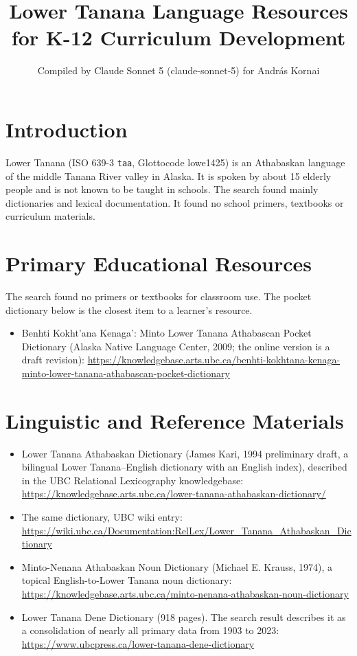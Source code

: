 \documentclass[12pt]{article}
\title{Lower Tanana Language Resources for K-12 Curriculum Development}
\author{Compiled by Claude Sonnet 5 (claude-sonnet-5) for Andr\'as Kornai}
\date{}
\begin{document}
\maketitle

\section{Introduction}
Lower Tanana (ISO 639-3 \texttt{taa}, Glottocode lowe1425) is an Athabaskan language of the middle Tanana River valley in Alaska. It is spoken by about 15 elderly people and is not known to be taught in schools. The search found mainly dictionaries and lexical documentation. It found no school primers, textbooks or curriculum materials.

\section{Primary Educational Resources}
The search found no primers or textbooks for classroom use. The pocket dictionary below is the closest item to a learner's resource.
\begin{itemize}
\item Benhti Kokht'ana Kenaga': Minto Lower Tanana Athabascan Pocket Dictionary (Alaska Native Language Center, 2009; the online version is a draft revision): \url{https://knowledgebase.arts.ubc.ca/benhti-kokhtana-kenaga-minto-lower-tanana-athabascan-pocket-dictionary}
\end{itemize}

\section{Linguistic and Reference Materials}
\begin{itemize}
\item Lower Tanana Athabaskan Dictionary (James Kari, 1994 preliminary draft, a bilingual Lower Tanana--English dictionary with an English index), described in the UBC Relational Lexicography knowledgebase: \url{https://knowledgebase.arts.ubc.ca/lower-tanana-athabaskan-dictionary/}
\item The same dictionary, UBC wiki entry: \url{https://wiki.ubc.ca/Documentation:RelLex/Lower_Tanana_Athabaskan_Dictionary}
\item Minto-Nenana Athabaskan Noun Dictionary (Michael E. Krauss, 1974), a topical English-to-Lower Tanana noun dictionary: \url{https://knowledgebase.arts.ubc.ca/minto-nenana-athabaskan-noun-dictionary}
\item Lower Tanana Dene Dictionary (918 pages). The search result describes it as a consolidation of nearly all primary data from 1903 to 2023: \url{https://www.ubcpress.ca/lower-tanana-dene-dictionary}
\end{itemize}
\end{document}
